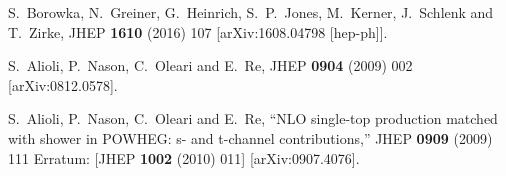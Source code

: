 \documentclass[paper]{JHEP3}
\begin{document}
\begin{thebibliography}{10}
  S.~Borowka, N.~Greiner, G.~Heinrich, S.~P.~Jones, M.~Kerner, J.~Schlenk and T.~Zirke,
  JHEP {\bf 1610} (2016) 107
  [arXiv:1608.04798 [hep-ph]].

  S.~Alioli, P.~Nason, C.~Oleari and E.~Re,
  JHEP {\bf 0904} (2009) 002
  [arXiv:0812.0578].

  S.~Alioli, P.~Nason, C.~Oleari and E.~Re,
  ``NLO single-top production matched with shower in POWHEG: s- and t-channel contributions,''
  JHEP {\bf 0909} (2009) 111
   Erratum: [JHEP {\bf 1002} (2010) 011]
  [arXiv:0907.4076].
  
\end{thebibliography}
\end{document}
